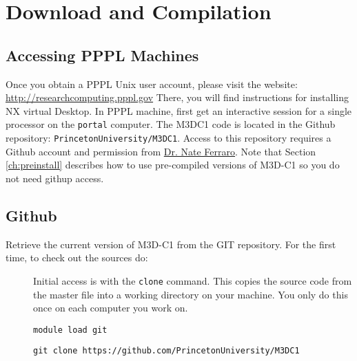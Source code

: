 \section{Download and Compilation}

\subsection{Accessing PPPL Machines}

Once you obtain a PPPL Unix user account, please visit the website:   
\newline\newline
\href{http://researchcomputing.pppl.gov}{http://researchcomputing.pppl.gov}
\newline\newline
There, you will find instructions for installing NX virtual Desktop.
\newline\newline
In PPPL machine, first get an interactive session for a single processor on the \texttt{portal} computer.    
The M3DC1 code is located in the Github repository: \texttt{PrincetonUniversity/M3DC1}. 
Access to this repository requires a Github account and permission from \href{mailto:nferraro@pppl.gov}{Dr. Nate Ferraro}. 
Note that Section \ref{ch:preinstall} describes how to use pre-compiled versions of M3D-C1 so you do not need githup access.

\subsection{Github}

Retrieve the current version of M3D-C1 from the GIT repository.  For the first time, to check out the sources do:
\begin{description}
\item[ ] Initial access is with the \texttt{clone} command.   This copies the source code from the master file into a working directory on your machine.   You only do this once on each computer you work on.
\item[ ] \texttt{module load git}
\item[ ] \texttt{git clone https://github.com/PrincetonUniversity/M3DC1}
\end{description}

